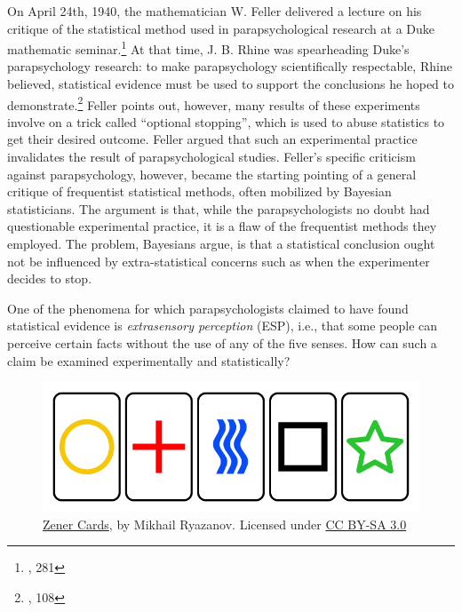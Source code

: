 On April 24th, 1940, the mathematician W. Feller delivered a lecture on
his critique of the statistical method used in parapsychological
research at a Duke mathematic seminar.\footnote{\cite{felleresp}, 281} At that time, J. B. Rhine was
spearheading Duke's parapsychology research: to make parapsychology
scientifically respectable, Rhine believed, statistical evidence must be
used to support the conclusions he hoped to demonstrate.\footnote{\cite{elusive}, 108} Feller points
out, however, many results of these experiments involve on a trick
called ``optional stopping'', which is used to abuse statistics to get
their desired outcome. Feller argued that such an experimental practice
invalidates the result of parapsychological studies. Feller's specific
criticism against parapsychology, however, became the starting pointing
of a general critique of frequentist statistical methods, often
mobilized by Bayesian statisticians. The argument is that, while the
parapsychologists no doubt had questionable experimental practice, it is
a flaw of the frequentist methods they employed. The problem, Bayesians
argue, is that a statistical conclusion ought not be influenced by
extra-statistical concerns such as when the experimenter decides to
stop.

One of the phenomena for which parapsychologists claimed to have found
statistical evidence is \emph{extrasensory perception} (ESP), i.e., that some
people can perceive certain facts without the use of any of the five
senses. How can such a claim be examined experimentally and
statistically?

\begin{figure}[h] 
\begin{center}
\includegraphics[scale=0.4]{zener.png}
	\caption{\href{https://commons.wikimedia.org/wiki/File:Zener_cards_(color).svg}{Zener Cards}, by Mikhail Ryazanov. Licensed under \href{https://creativecommons.org/licenses/by-sa/3.0/deed.en}{CC BY-SA 3.0}}
	\label{fig:zen}
\end{center}	
\end{figure}



